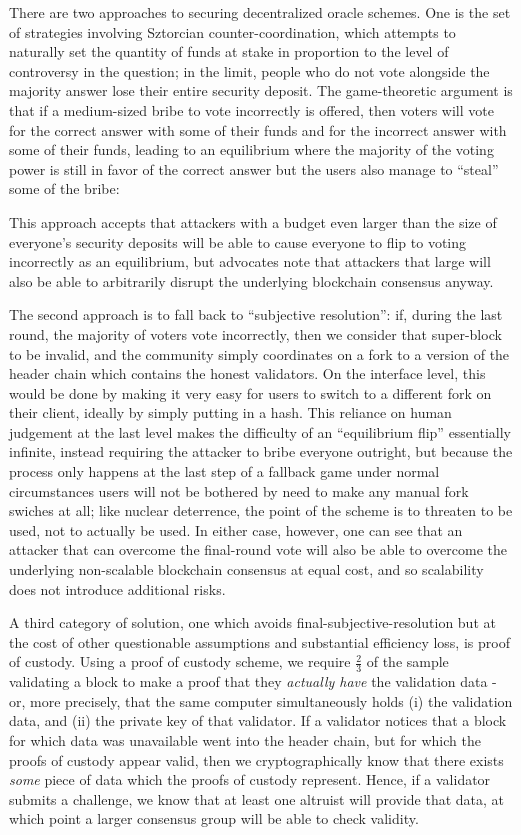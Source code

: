 \documentclass[11pt,a4paper]{report}
\theoremstyle{plain}
\theoremstyle{definition}
\theoremstyle{remark}
\begin{document}
There are two approaches to securing decentralized oracle schemes. One is the set of strategies involving Sztorcian counter-coordination, which attempts to naturally set the quantity of funds at stake in proportion to the level of controversy in the question; in the limit, people who do not vote alongside the majority answer lose their entire security deposit. The game-theoretic argument is that if a medium-sized bribe to vote incorrectly is offered, then voters will vote for the correct answer with some of their funds and for the incorrect answer with some of their funds, leading to an equilibrium where the majority of the voting power is still in favor of the correct answer but the users also manage to ``steal'' some of the bribe:

This approach accepts that attackers with a budget even larger than the size of everyone's security deposits will be able to cause everyone to flip to voting incorrectly as an equilibrium, but advocates note that attackers that large will also be able to arbitrarily disrupt the underlying blockchain consensus anyway.

The second approach is to fall back to ``subjective resolution'': if, during the last round, the majority of voters vote incorrectly, then we consider that super-block to be invalid, and the community simply coordinates on a fork to a version of the header chain which contains the honest validators. On the interface level, this would be done by making it very easy for users to switch to a different fork on their client, ideally by simply putting in a hash. This reliance on human judgement at the last level makes the difficulty of an ``equilibrium flip'' essentially infinite, instead requiring the attacker to bribe everyone outright, but because the process only happens at the last step of a fallback game under normal circumstances users will not be bothered by need to make any manual fork swiches at all; like nuclear deterrence, the point of the scheme is to threaten to be used, not to actually be used. In either case, however, one can see that an attacker that can overcome the final-round vote will also be able to overcome the underlying non-scalable blockchain consensus at equal cost, and so scalability does not introduce additional risks.

A third category of solution, one which avoids final-subjective-resolution but at the cost of other questionable assumptions and substantial efficiency loss, is proof of custody. Using a proof of custody scheme, we require $\frac{2}{3}$ of the sample validating a block to make a proof that they \emph{actually have} the validation data - or, more precisely, that the same computer simultaneously holds (i) the validation data, and (ii) the private key of that validator. If a validator notices that a block for which data was unavailable went into the header chain, but for which the proofs of custody appear valid, then we cryptographically know that there exists \emph{some} piece of data which the proofs of custody represent. Hence, if a validator submits a challenge, we know that at least one altruist will provide that data, at which point a larger consensus group will be able to check validity.
\end{document}
